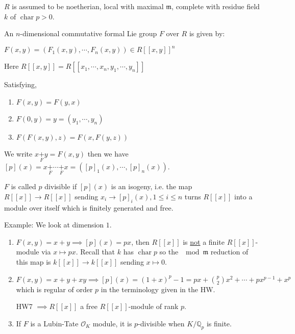 \documentclass{article}
\theoremstyle{definition}
\numberwithin{theorem}{subsection}
\begin{document}
    \(R\) is assumed to be noetherian, local with maximal \(\mathfrak{m}\), complete with residue field \(k\) of \(\operatorname{char} p > 0\).

    An \(n\)-dimensional commutative formal Lie group \(F\) over \(R\) is given by:

    \(F(x,y) = (F_1(x,y), \cdots , F_n(x,y)) \in R[[x,y]]^n\)

    Here \(R[[x,y]] = R[[x_1, \cdots , x_n, y_1, \cdots , y_n]]\)

    Satisfying,

    \begin{enumerate}[label=\roman*)]
        \item \(F(x,y)=F(y,x)\)
        \item \(F(0,y)=y = (y_1, \cdots , y_n)\)
        \item \(F(F(x,y),z)=F(x,F(y,z))\)  
    \end{enumerate} 

    We write \(x \underset{F}{+} y = F(x,y)\) then we have \([p](x) = x \underset{F}{+} \cdots \underset{F}{+} x = ([p]_1 (x), \cdots , [p]_n(x))\).

    \(F\) is called \(p\) divisible if \([p](x)\) is an isogeny, i.e. the map \(R[[x]] \to R[[x]]\) sending \(x_i \to [p]_i (x), 1 \leq i \leq n\) turns \(R[[x]]\) into a module over itself which is finitely generated and free.

    Example: We look at dimension \(1\).

    \begin{enumerate}[label=\arabic*)]
        \item \(F(x,y) = x + y \implies [p](x) = px\), then \(R[[x]]\) is \underline{not} a finite \(R[[x]]\)-module via \(x \mapsto px\). Recall that \(k\) has \(\operatorname{char} p\) so the \(\mod \mathfrak{m}\) reduction of this map is \(k[[x]] \to k[[x]]\) sending \(x \mapsto 0\).
        \item \(F(x,y) = x + y + xy \implies [p](x) = (1+x)^p - 1 = px + \binom{p}{2} x^2 + \cdots + p x^{p-1} + x^p\) which is regular of order \(p\) in the terminology given in the HW.
        
        HW7 \(\implies R[[x]]\) a free \(R[[x]]\)-module of rank \(p\).
        
        \item If \(F\) is a Lubin-Tate \(\mathcal{O}_K\) module, it is \(p\)-divisible when \(K / \mathbb{Q}_p\) is finite.
    \end{enumerate} 
\end{document}
